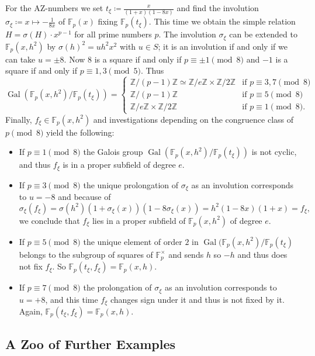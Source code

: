 \documentclass{article}
\newcommand{\Z}{\mathbb{Z}}
\newcommand{\F}{\mathbb{F}}
\DeclareMathOperator{\Gal}{Gal}
\theoremstyle{definition}
\theoremstyle{plain}
\theoremstyle{remark}
\begin{document}
For the AZ-numbers we set $t_\xi\coloneqq \frac x {(1+x)(1-8x)}$ and find the involution $\sigma_\xi\coloneqq x\mapsto -\frac 1 {8x}$ of $\F_p(x)$ fixing $\F_p(t_\xi)$. This time we obtain the simple relation $H=\sigma(H)\cdot x^{p-1}$ for all prime numbers $p$. The involution $\sigma_\xi$ can be extended to $\F_p(x, h^2)$ by $\sigma(h)^2=u h^2 x^2$ with $u\in S$; it is an involution if and only if we can take $u=\pm 8$. Now $8$ is a square if and only if $p\equiv \pm 1 \pmod 8$ and $-1$ is a square if and only if $p\equiv 1, 3 \pmod 5$. Thus 
\[\Gal(\F_p(x, h^2)/\F_p(t_\xi)) = 
        \begin{cases}
            \Z/(p{-}1)\Z\simeq \Z/e\Z\times \Z/2\Z & \text{if } p\equiv 3,7 \pmod 8\\
            \Z/(p{-}1)\Z & \text{if } p\equiv 5 \pmod 8\\
            \Z/e\Z\times \Z/2\Z& \text{if } p\equiv 1 \pmod 8.
        \end{cases}
    \]
Finally, $f_\xi \in \F_p(x, h^2)$ and investigations depending on the congruence class of $p\pmod 8$ yield the following:
\begin{itemize}
    \item If $p\equiv 1 \pmod 8$ the Galois group $\Gal(\F_p(x, h^2)/\F_p(t_\xi))$ is not cyclic, and thus $f_\xi$ is in a proper subfield of degree $e$.
    \item If $p\equiv 3 \pmod 8$ the unique prolongation of $\sigma_\xi$ as an involution corresponds to $u=-8$ and because of 
    \[\textstyle \sigma_\xi (f_\xi)= \sigma(h^2) (1+\sigma_\xi(x))(1-8\sigma_\xi(x)) =  h^2 (1-8x)(1+x)= f_\xi,\]
    we conclude that $f_\xi$ lies in a proper subfield of $\F_p(x, h^2)$ of degree $e$.
    \item If $p\equiv 5 \pmod 8$ the unique element of order $2$ in $\Gal(\F_p(x, h^2)/\F_p(t_\xi)$ belongs to the subgroup of squares of $\F_p^\times$ and sends $h$ so $-h$ and thus does not fix $f_\xi$. So  $\F_p(t_\xi, f_\xi)=\F_p(x, h)$.
    \item If $p\equiv 7 \pmod 8$ the prolongation of $\sigma_\xi$ as an involution corresponds to $u=+8$, and this time $f_\xi$ changes sign under it and thus is not fixed by it. Again, $\F_p(t_\xi, f_\xi)=\F_p(x, h)$.
\end{itemize}

\subsection{A Zoo of Further Examples} \label{ssec:zoo}
\end{document}
